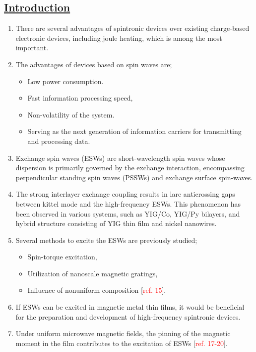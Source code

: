 \subsection*{\underline{Introduction}}
\begin{enumerate}
    \item There are several advantages of spintronic devices over existing charge-based electronic devices, including joule heating, which is among the most important.
    \item The advantages of devices based on spin waves are;
    \begin{itemize}
        \item Low power consumption.
        \item Fast information processing speed, 
        \item Non-volatility of the system.
        \item Serving as the next generation of information carriers for transmitting and processing data.
    \end{itemize}
    \item Exchange spin waves (ESWs) are short-wavelength spin waves whose dispersion is primarily governed by the exchange interaction, encompassing perpendicular standing spin waves (PSSWs) and exchange surface spin-waves.
    \item The strong interlayer exchange coupling results in lare anticrossing gaps between kittel mode and the high-frequency ESWs. This phenomenon has been observed in various systems, such as YIG/Co, YIG/Py bilayers, and hybrid structure consisting of YIG thin film and nickel nanowires.
    \item Several methods to excite the ESWs are previously studied;
    \begin{itemize}
        \item Spin-torque excitation, 
        \item Utilization of nanoscale magnetic gratings, 
        \item Influence of nonuniform composition [\textcolor{red}{ref. 15}].
    \end{itemize}
    \item If ESWs can be excited in magnetic metal thin films, it would be beneficial for the preparation and development of high-frequency spintronic devices.
    \item Under uniform microwave magnetic fields, the pinning of the magnetic moment in the film contributes to the excitation of ESWs [\textcolor{red}{ref. 17-20}].

\end{enumerate}
